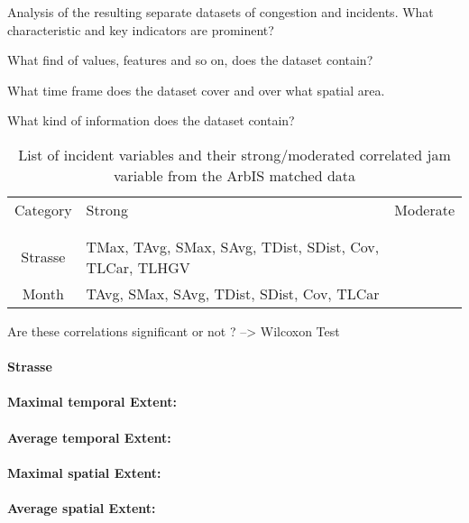 Analysis of the resulting separate datasets of congestion and incidents. What characteristic and key indicators are prominent?

What find of values, features and so on, does the dataset contain?

What time frame does the dataset cover and over what spatial area.

What kind of information does the dataset contain?

\noindent
\begin{table}[h!]
	\centering
	\begin{tabular}{c|l|l}  
		Category & Strong & Moderate \\
		\\[-1em]
		\hline
		\\[-1em]
		Strasse & TMax, TAvg, SMax, SAvg, TDist, SDist, Cov, TLCar, TLHGV & \\ 
 		Month & TAvg, SMax, SAvg, TDist, SDist, Cov, TLCar & \\
	\end{tabular}
	\caption{List of incident variables and their strong/moderated correlated jam variable from the ArbIS matched data}
\end{table}

Are these correlations significant or not ? --> Wilcoxon Test

\paragraph{Strasse}

\paragraph{Maximal temporal Extent:}
\paragraph{Average temporal Extent:}
\paragraph{Maximal spatial Extent:}
\paragraph{Average spatial Extent:}
